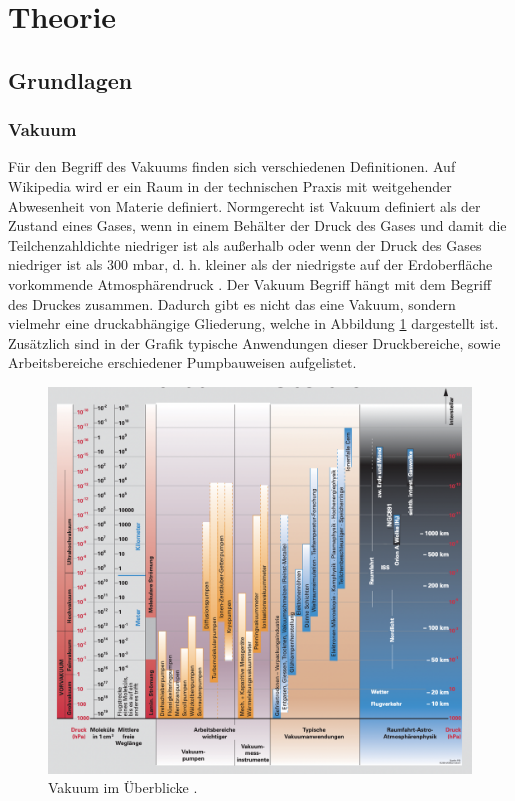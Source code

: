 \section{Theorie}
\label{sec:Theorie}

\subsection{Grundlagen}
\subsubsection{Vakuum}
Für den Begriff des Vakuums finden sich verschiedenen Definitionen.
Auf Wikipedia wird er ein Raum in der technischen Praxis mit weitgehender Abwesenheit von Materie definiert\cite{dewiki}.
Normgerecht ist Vakuum definiert als der Zustand eines Gases, wenn in einem Behälter der Druck des Gases 
und damit die Teilchenzahldichte niedriger ist als außerhalb oder wenn der Druck des Gases niedriger ist als 300 mbar,
d. h. kleiner als der niedrigste auf der Erdoberfläche vorkommende Atmosphärendruck \cite{DIN}.
Der Vakuum Begriff hängt mit dem Begriff des Druckes zusammen.
Dadurch gibt es nicht das eine Vakuum, sondern vielmehr eine druckabhängige Gliederung,
welche in Abbildung \ref{fig:Vakuum} dargestellt ist. 
Zusätzlich sind in der Grafik typische Anwendungen dieser Druckbereiche,
sowie Arbeitsbereiche erschiedener Pumpbauweisen aufgelistet.
\begin{figure}[ht]
    \centering
    \includegraphics[width=\textwidth]{abb/Vakuum.png}
    \caption{Vakuum im Überblicke \cite{Pfeifer}.}
    \label{fig:Vakuum}
\end{figure}

